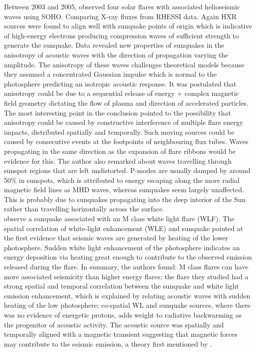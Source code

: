 Between 2003 and 2005, \cite{2006SoPh..238....1K} observed four solar flares with associated helioseismic waves using SOHO. Comparing X-ray fluxes from RHESSI data. Again HXR sources were found to align well with sunquake points of origin which is indicative of high-energy electrons producing compression waves of sufficient strength to generate the sunquake. Data revealed new properties of sunquakes in the anisotropy of acoustic waves with the direction of propagation varying the amplitude. The anisotropy of these waves challenges theoretical models \citep{2000AcA....50..405M,2003SoPh..218..227P, 2005SoPh..232....1P} because they assumed a concentrated Gaussian impulse which is normal to the photosphere predicting an isotropic acoustic response. It was postulated that anisotropy could be due to a sequential release of energy + complex magnetic field geometry dictating the flow of plasma and direction of accelerated particles. The most interesting point in the conclusion pointed to the possibility that anisotropy could be caused by constructive interference of multiple flare energy impacts, distributed spatially and temporally. Such moving sources could be caused by consecutive events at the footpoints of neighbouring flux tubes. Waves propagating in the same direction as the expansion of flare ribbons would be evidence for this. The author also remarked about waves travelling through sunspot regions that are left undistorted. P-modes are usually damped by around 50\% in sunspots, which is attributed to energy escaping along the more radial magnetic field lines as MHD waves, whereas sunquakes seem largely unaffected. This is probably due to sunquakes propagating into the deep interior of the Sun rather than travelling horizontally across the surface. \\


\cite{2006SoPh..239..113D} observe a sunquake associated with an M class white light flare (WLF). The spatial correlation of white-light enhancement (WLE) and sunquake pointed at the first evidence that seismic waves are generated by heating of the lower photosphere. Sudden white light enhancement of the photosphere indicates an energy deposition via heating great enough to contribute to the observed emission released during the flare. In summary, the authors found: M class flares can have more associated seismicity than higher energy flares; the flare they studied had a strong spatial and temporal correlation between the sunquake and white light emission enhancement, which is explained by relating acoustic waves with sudden heating of the low photosphere; co-spatial WL and sunquake sources, where there was no evidence of energetic protons, adds weight to radiative backwarming as the progenitor of acoustic activity. The acoustic source was spatially and temporally aligned with a magnetic transient suggesting that magnetic forces may contribute to the seismic emission, a theory first mentioned by \cite{2001ApJ...550L.105K}. \\

